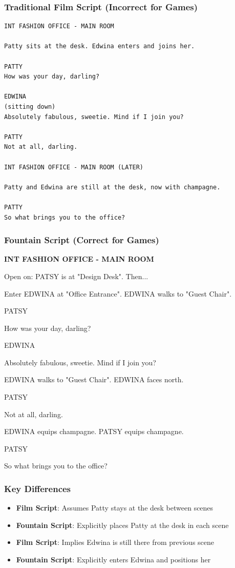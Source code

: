 \documentclass[11pt,letterpaper,oldstylefigures]{memoir}
\newcommand{\slugline}[1]{\nobreak\textbf{\MakeUppercase{#1}}\par\nobreak\vspace{1\baselineskip}}
\newcommand{\speaker}[1]{\nobreak\hspace*{0.333\textwidth}\MakeUppercase{#1}\par\nobreak\vspace{0.5\baselineskip}}
\newcommand{\dialogue}[1]{\nobreak\hspace*{0.25\textwidth}\begin{minipage}{0.5\textwidth}#1\end{minipage}\par\vspace{1\baselineskip}}
\newcommand{\stagedir}[1]{#1\par\vspace{1\baselineskip}}
\newenvironment{FountainExample}
  {\begingroup
  \ttfamily\small
   \setlength{\parindent}{0pt}
  \setlength{\parskip}{0.5em}
  \allowdisplaybreaks
  \setlength{\displaywidowpenalty}{0}
  \setlength{\widowpenalty}{0}
  \setlength{\clubpenalty}{0}
  \setlength{\interlinepenalty}{0}
}
  {\endgroup}
\begin{document}
\subsubsection{Traditional Film Script (Incorrect for Games)}
\begin{verbatim}
INT FASHION OFFICE - MAIN ROOM

Patty sits at the desk. Edwina enters and joins her.

PATTY
How was your day, darling?

EDWINA
(sitting down)
Absolutely fabulous, sweetie. Mind if I join you?

PATTY
Not at all, darling.

INT FASHION OFFICE - MAIN ROOM (LATER)

Patty and Edwina are still at the desk, now with champagne.

PATTY
So what brings you to the office?
\end{verbatim}

\subsubsection{Fountain Script (Correct for Games)}
\begin{FountainExample}
\slugline{INT FASHION OFFICE - MAIN ROOM}

\stagedir{Open on: PATSY is at "Design Desk". Then...}
\stagedir{Enter EDWINA at "Office Entrance". EDWINA walks to "Guest Chair".}

\speaker{PATSY}
\dialogue{How was your day, darling?}

\speaker{EDWINA}
\dialogue{Absolutely fabulous, sweetie. Mind if I join you?}

\stagedir{EDWINA walks to "Guest Chair". EDWINA faces north.}

\speaker{PATSY}
\dialogue{Not at all, darling.}

\stagedir{EDWINA equips champagne. PATSY equips champagne.}

\speaker{PATSY}
\dialogue{So what brings you to the office?}
\end{FountainExample}

\subsubsection{Key Differences}
\begin{itemize}
\item \textbf{Film Script}: Assumes Patty stays at the desk between scenes
\item \textbf{Fountain Script}: Explicitly places Patty at the desk in each scene
\item \textbf{Film Script}: Implies Edwina is still there from previous scene
\item \textbf{Fountain Script}: Explicitly enters Edwina and positions her
\end{itemize}
\end{document}
